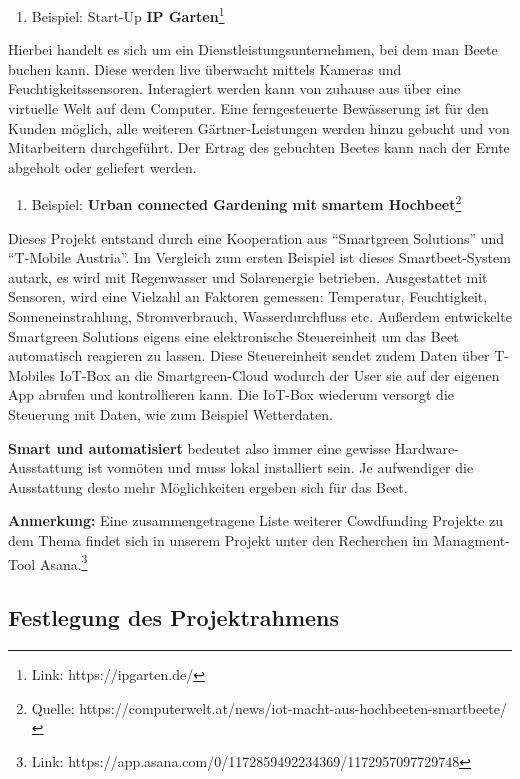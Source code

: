 \begin{enumerate}
\def\labelenumi{\arabic{enumi}.}
\tightlist
\item
  Beispiel: Start-Up \textbf{IP Garten}\footnote{Link:
    https://ipgarten.de/}
\end{enumerate}

Hierbei handelt es sich um ein Dienstleistungsunternehmen, bei dem man
Beete buchen kann. Diese werden live überwacht mittels Kameras und
Feuchtigkeitssensoren. Interagiert werden kann von zuhause aus über eine
virtuelle Welt auf dem Computer. Eine ferngesteuerte Bewässerung ist für
den Kunden möglich, alle weiteren Gärtner-Leistungen werden hinzu
gebucht und von Mitarbeitern durchgeführt. Der Ertrag des gebuchten
Beetes kann nach der Ernte abgeholt oder geliefert werden.

\begin{enumerate}
\def\labelenumi{\arabic{enumi}.}
\setcounter{enumi}{1}
\tightlist
\item
  Beispiel: \textbf{Urban connected Gardening mit smartem
  Hochbeet}\footnote{Quelle:
    https://computerwelt.at/news/iot-macht-aus-hochbeeten-smartbeete/}
\end{enumerate}

Dieses Projekt entstand durch eine Kooperation aus ``Smartgreen
Solutions'' und ``T-Mobile Austria''. Im Vergleich zum ersten Beispiel
ist dieses Smartbeet-System autark, es wird mit Regenwasser und
Solarenergie betrieben. Ausgestattet mit Sensoren, wird eine Vielzahl an
Faktoren gemessen: Temperatur, Feuchtigkeit, Sonneneinstrahlung,
Stromverbrauch, Wasserdurchfluss etc. Außerdem entwickelte Smartgreen
Solutions eigens eine elektronische Steuereinheit um das Beet
automatisch reagieren zu lassen. Diese Steuereinheit sendet zudem Daten
über T-Mobiles IoT-Box an die Smartgreen-Cloud wodurch der User sie auf
der eigenen App abrufen und kontrollieren kann. Die IoT-Box wiederum
versorgt die Steuerung mit Daten, wie zum Beispiel Wetterdaten.

\textbf{Smart und automatisiert} bedeutet also immer eine gewisse
Hardware-Ausstattung ist vonnöten und muss lokal installiert sein. Je
aufwendiger die Ausstattung desto mehr Möglichkeiten ergeben sich für
das Beet.

\textbf{Anmerkung:} Eine zusammengetragene Liste weiterer Cowdfunding
Projekte zu dem Thema findet sich in unserem Projekt unter den
Recherchen im Managment-Tool Asana.\footnote{Link:
  https://app.asana.com/0/1172859492234369/1172957097729748}

\hypertarget{festlegung-des-projektrahmens}{%
\subsection{Festlegung des
Projektrahmens}\label{festlegung-des-projektrahmens}}


